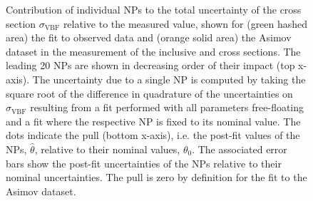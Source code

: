 \begin{figure}[t]
    \centering
    {\caption[Contribution of individual NPs to the total uncertainty of $\sigma_{\mathrm{VBF}}$ as well as NP pulls and constraints.]{Contribution of individual NPs to the total uncertainty of the cross section $\sigma_{\mathrm{VBF}}$ relative to the measured value, shown for (green hashed area) the fit to observed data and (orange solid area) the Asimov dataset in the measurement of the inclusive \muVBF and \muGGF cross sections. The leading 20 NPs are shown in decreasing order of their impact (top x-axis).
    The uncertainty due to a single NP is computed by taking the square root of the difference in quadrature of the uncertainties on $\sigma_{\mathrm{VBF}}$ resulting from a fit performed with all parameters free-floating and a fit where the respective NP is fixed to its nominal value. 
    The dots indicate the pull (bottom x-axis), i.e. the post-fit values of the NPs, $\hat{\theta}$, relative to their nominal values, $\theta_0$. 
    The associated error bars show the post-fit uncertainties of the NPs relative to their nominal uncertainties. 
    The pull is zero by definition for the fit to the Asimov dataset.
    \label{fig:fit:breakdown} }}
\end{figure}
\clearpage




